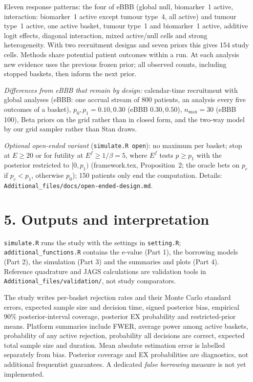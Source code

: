 \documentclass[10pt,a4paper]{article}
\begin{document}
Eleven response patterns: the four of eBBB (global null, biomarker~1 active,
interaction: biomarker~1 active except tumour type~4, all active) and tumour
type~1 active, one active basket, tumour type~1 and biomarker~1 active,
additive logit effects, diagonal interaction, mixed active/null cells and
strong heterogeneity. With two recruitment designs and seven priors this gives
154 study cells. Methods share potential patient outcomes within a run. At each
analysis new evidence uses the previous frozen prior; all observed counts,
including stopped baskets, then inform the next prior.

\emph{Differences from eBBB that remain by design:} calendar-time recruitment
with global analyses (eBBB: one accrual stream of 800 patients, an analysis
every five outcomes of a basket), $p_0,p_1=0.10,0.30$ (eBBB $0.30,0.50$),
$n_{\max}=30$ (eBBB 100), Beta priors on the grid rather than in closed form,
and the two-way model by our grid sampler rather than Stan draws.

\emph{Optional open-ended variant} (\texttt{simulate.R open}): no maximum per
basket; stop at $E\ge20$ or for futility at $E^f\ge1/\beta=5$, where $E^f$
tests $p\ge p_1$ with the posterior restricted to $[0,p_1)$ (framework.tex,
Proposition~2; the oracle bets on $p_c$ if $p_c<p_1$, otherwise $p_0$); 150
patients only end the computation. Details:
\texttt{Additional\_files/docs/open-ended-design.md}.

\newpage
\section*{5. Outputs and interpretation}
\texttt{simulate.R} runs the study with the settings in \texttt{setting.R};
\texttt{additional\_functions.R} contains the e-value (Part 1), the borrowing
models (Part 2), the simulation (Part 3) and the summaries and plots (Part 4).
Reference quadrature and JAGS calculations are validation tools in
\texttt{Additional\_files/validation/}, not study comparators.

The study writes per-basket rejection rates and their Monte Carlo standard
errors, expected sample size and decision time, signed posterior bias,
empirical 90\% posterior-interval coverage, posterior EX probability and
restricted-prior means. Platform summaries include FWER, average power among
active baskets, probability of any active rejection, probability all decisions
are correct, expected total sample size and duration. Mean absolute
estimation error is labelled separately from bias.
Posterior coverage and EX probabilities are diagnostics, not additional
frequentist guarantees. A dedicated \emph{false borrowing} measure is not yet
implemented.
\end{document}
